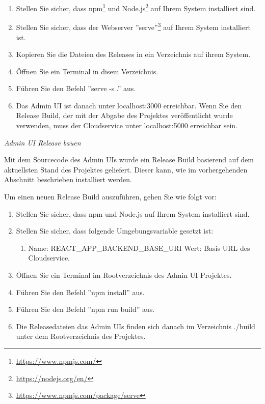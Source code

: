 \begin{enumerate}
    \item Stellen Sie sicher, dass npm\footnote{\href{https://www.npmjs.com/}{https://www.npmjs.com/}}  und Node.js\footnote{\href{https://nodejs.org/en/}{https://nodejs.org/en/}} auf Ihrem System installiert sind.
    \item Stellen Sie sicher, dass der Webserver ''serve''\footnote{\href{https://www.npmjs.com/package/serve}{https://www.npmjs.com/package/serve}} auf Ihrem System installiert ist.
    \item Kopieren Sie die Dateien des Releases in ein Verzeichnis auf ihrem System.
    \item Öffnen Sie ein Terminal in disem Verzeichnis.
    \item Führen Sie den Befehl ''serve -s .'' aus.
    \item Das Admin UI ist danach unter localhost:3000 erreichbar.
    Wenn Sie den Release Build, der mit der Abgabe des Projektes veröffentlicht wurde verwenden, muss der Cloudservice unter localhost:5000 erreichbar sein.
\end{enumerate}


\textit{Admin UI Release bauen}

Mit dem Sourcecode des Admin UIs wurde ein Release Build basierend auf dem aktuellsten Stand des Projektes geliefert.
Dieser kann, wie im vorhergehenden Abschnitt beschrieben installiert werden.

Um einen neuen Release Build auszuführen, gehen Sie wie folgt vor:

\begin{enumerate}
    \item Stellen Sie sicher, dass npm und Node.js auf Ihrem System installiert sind.
    \item Stellen Sie sicher, dass folgende Umgebungsvariable gesetzt ist:
    \begin{enumerate}
        \item Name: REACT\_APP\_BACKEND\_BASE\_URI   Wert: Basis URL des Cloudservice.   
    \end{enumerate}
    \item Öffnen Sie ein Terminal im Rootverzeichnis des Admin UI Projektes.
    \item Führen Sie den Befehl ''npm install''  aus.
    \item Führen Sie den Befehl ''npm run build'' aus.
    \item Die Releasedateien das Admin UIs finden sich danach im Verzeichnis ./build unter dem Rootverzeichnis des Projektes. 
\end{enumerate}


